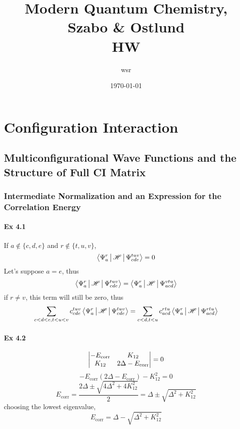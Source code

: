 \documentclass[a4paper]{article}
\title{\textbf{Modern Quantum Chemistry, Szabo \& Ostlund}\\HW}
\author{wsr
\vspace{5pt}\\
}
\date{\today} %
\DeclareMathOperator{\corr}{\mathrm{corr}}
\newcommand{\ex}[1]{\paragraph{Ex #1}}
\numberwithin{equation}{subsection}
\begin{document}

\maketitle

\tableofcontents

\newpage

\setcounter{section}{3}
\section{Configuration Interaction}
\subsection{Multiconfigurational Wave Functions and the Structure of Full CI Matrix}

\subsubsection{Intermediate Normalization and an Expression for the Correlation Energy}
\ex{4.1}
If $ a\notin \{c,d,e\} $ and $ r\notin\{t,u,v\} $,
\begin{equation}\label{key}
\Braket{\Psi_a^r | \mathscr{H} | \Psi_{cde}^{tuv}} = 0
\end{equation}
Let's suppose $ a = e $, thus
\begin{equation}\label{key}
\Braket{\Psi_a^r | \mathscr{H} | \Psi_{cde}^{tuv}} = \Braket{\Psi_a^r | \mathscr{H} | \Psi_{acd}^{vtu}} 
\end{equation}
if $ r\neq v $, this term will still be zero, thus
\begin{equation}\label{key}
\sum_{c<d<e,t<u<v} c_{cde}^{tuv} \Braket{\Psi_a^r | \mathscr{H} | \Psi_{cde}^{tuv}} = \sum_{c<d,t<u} c_{acd}^{rtu} \Braket{\Psi_a^r | \mathscr{H} | \Psi_{acd}^{rtu}} 
\end{equation}

\ex{4.2}
\begin{equation}\label{key}
\mqty|-E_{\corr} & K_{12}\\ K_{12} & 2\Delta-E_{\corr}| = 0
\end{equation}
\begin{equation}\label{key}
-E_{\corr}(2\Delta-E_{\corr}) - K_{12}^2 = 0
\end{equation}
\begin{equation}\label{key}
E_{\corr} = \dfrac{2\Delta \pm \sqrt{4\Delta^2 + 4K_{12}^2}}{2} = \Delta \pm \sqrt{\Delta^2 + K_{12}^2}
\end{equation}
choosing the lowest eigenvalue,
\begin{equation}\label{key}
E_{\corr} = \Delta - \sqrt{\Delta^2 + K_{12}^2}
\end{equation}
\end{document}
